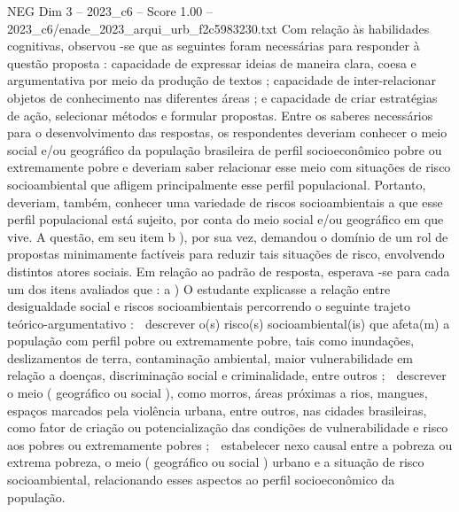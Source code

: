 \begin{textsample}{NEG Dim 3 – 2023\_c6 – Score 1.00 – 2023\_c6/enade\_2023\_arqui\_urb\_f2c5983230.txt}
Com relação às habilidades cognitivas, observou -se que as seguintes foram necessárias para responder à questão proposta : capacidade de expressar ideias de maneira clara, coesa e argumentativa por meio da produção de textos ; capacidade de inter-relacionar objetos de conhecimento nas diferentes áreas ; e capacidade de criar estratégias de ação, selecionar métodos e formular propostas.
Entre os saberes necessários para o desenvolvimento das respostas, os respondentes deveriam conhecer o meio social e/ou geográfico da população brasileira de perfil socioeconômico pobre ou extremamente pobre e deveriam saber relacionar esse meio com situações de risco socioambiental que afligem principalmente esse perfil populacional.
Portanto, deveriam, também, conhecer uma variedade de riscos socioambientais a que esse perfil populacional está sujeito, por conta do meio social e/ou geográfico em que vive.
A questão, em seu item b ), por sua vez, demandou o domínio de um rol de propostas minimamente factíveis para reduzir tais situações de risco, envolvendo distintos atores sociais.
Em relação ao padrão de resposta, esperava -se para cada um dos itens avaliados que : a ) O estudante explicasse a relação entre desigualdade social e riscos socioambientais percorrendo o seguinte trajeto teórico-argumentativo :  descrever o(s) risco(s) socioambiental(is) que afeta(m) a população com perfil pobre ou extremamente pobre, tais como inundações, deslizamentos de terra, contaminação ambiental, maior vulnerabilidade em relação a doenças, discriminação social e criminalidade, entre outros ;  descrever o meio ( geográfico ou social ), como morros, áreas próximas a rios, mangues, espaços marcados pela violência urbana, entre outros, nas cidades brasileiras, como fator de criação ou potencialização das condições de vulnerabilidade e risco aos pobres ou extremamente pobres ;  estabelecer nexo causal entre a pobreza ou extrema pobreza, o meio ( geográfico ou social ) urbano e a situação de risco socioambiental, relacionando esses aspectos ao perfil socioeconômico da população.

\end{textsample}
